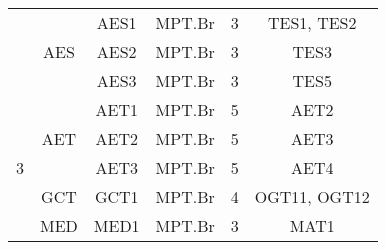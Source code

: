 \begin{table}[H]
{\begin{tabular}{|c|c|c|c|c|c|}
& \multirow{3}{*}{AES} 
    & AES1 & MPT.Br & 3 & TES1, TES2                                                                \\ \cline{3-6} 
                                                                                        &                      & AES2        & MPT.Br          & 3                                                                                   & TES3                                                                      \\ \cline{3-6} 
                                                                                        &                      & AES3        & MPT.Br          & 3                                                                                   & TES5                                                                      \\ \hline
\multirow{7}{*}{3}                                                                      & \multirow{3}{*}{AET} & AET1        & MPT.Br          & 5                                                                                   & AET2                                                                      \\ \cline{3-6} 
                                                                                        &                      & AET2        & MPT.Br          & 5                                                                                   & AET3                                                                      \\ \cline{3-6} 
                                                                                        &                      & AET3        & MPT.Br          & 5                                                                                   & AET4                                                                      \\ \cline{2-6} 
                                                                                        & GCT                  & GCT1        & MPT.Br          & 4                                                                                   & OGT11, OGT12                                                              \\ \cline{2-6} 
                                                                                        & \multirow{3}{*}{MED} & MED1        & MPT.Br          & 3                                                                                   & MAT1                                                                      \\ \cline{3-6} 

\end{tabular}}
\end{table}
